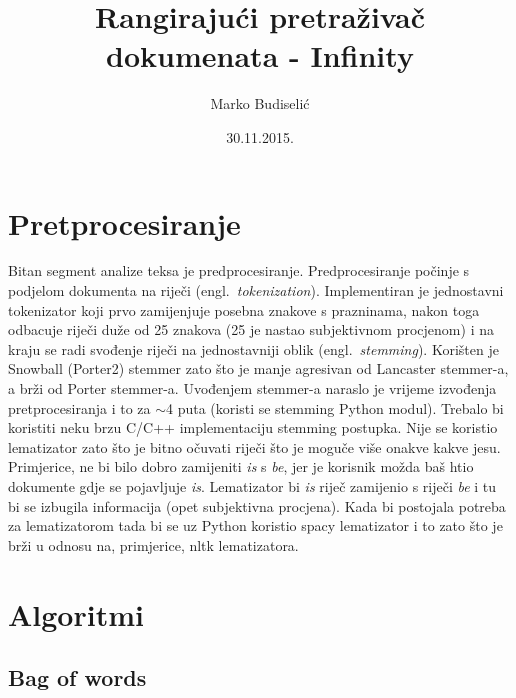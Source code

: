 \documentclass[a4paper,12pt]{article}
\title{Rangirajući pretraživač dokumenata - Infinity}
\author{Marko Budiselić}
\date{30.11.2015.}
\newcommand{\engl}[1]{(engl.~\emph{#1})}
\begin{document}
\maketitle

\section{Pretprocesiranje}

Bitan segment analize teksa je predprocesiranje. Predprocesiranje počinje s podjelom dokumenta na riječi \engl{tokenization}. Implementiran je jednostavni tokenizator koji prvo zamijenjuje posebna znakove s prazninama, nakon toga odbacuje riječi duže od 25 znakova (25 je nastao subjektivnom procjenom) i na kraju se radi svođenje riječi na jednostavniji oblik \engl{stemming}. Korišten je Snowball (Porter2) stemmer zato što je manje agresivan od Lancaster stemmer-a, a brži od Porter stemmer-a. Uvođenjem stemmer-a naraslo je vrijeme izvođenja pretprocesiranja i to za $\sim$4 puta (koristi se stemming Python modul). Trebalo bi koristiti neku brzu C/C++ implementaciju stemming postupka. Nije se koristio lematizator zato što je bitno očuvati riječi što je moguče više onakve kakve jesu. Primjerice, ne bi bilo dobro zamijeniti \textit{is} s \textit{be}, jer je korisnik možda baš htio dokumente gdje se pojavljuje \textit{is}. Lematizator bi \textit{is} riječ zamijenio s riječi \textit{be} i tu bi se izbugila informacija (opet subjektivna procjena). Kada bi postojala potreba za lematizatorom tada bi se uz Python koristio spacy lematizator i to zato što je brži u odnosu na, primjerice, nltk lematizatora. 

\section{Algoritmi}

\subsection{Bag of words}
\end{document}
